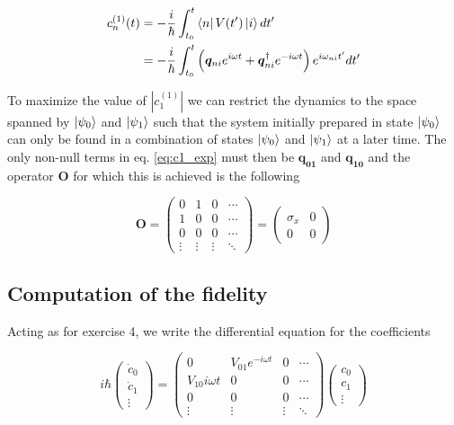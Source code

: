 \documentclass{article}
\begin{document}
\begin{align}
\label{eq:c1_exp}
c_n^{(1)}(t) & = -\frac{i}{\hbar} \int_{t_0}^t \bra{n} V(t') \ket{i} dt' \nonumber \\
& = -\frac{i}{\hbar} \int_{t_0}^t \left( \bm{q}_{ni} e^{i\omega t} + \bm{q}_{ni}^{\dagger} e^{-i\omega t}\right) e^{i\omega_{ni}t'} dt'
\end{align}

To maximize the value of \( |c_1^{(1)}| \) we can restrict the dynamics to the space spanned by \( \ket{\psi_0} \) and \( \ket{\psi_1} \) such that the system initially prepared in state \( \ket{\psi_0} \) can only be found in a combination of states \( \ket{\psi_0} \) and \( \ket{\psi_1} \) at a later time. The only non-null terms in eq. \eqref{eq:c1_exp} must then be \( \bm{q_{01}} \) and \( \bm{q_{10}} \) and the operator \( \bm{O} \) for which this is achieved is the following

\begin{equation}
\bm{O} =
  \begin{pmatrix}
    0 & 1 & 0 & \cdots \\
    1 & 0 & 0 & \cdots \\
    0 & 0 & 0 & \cdots \\
    \vdots & \vdots & \vdots & \ddots
  \end{pmatrix}
=
  \begin{pmatrix}
    \sigma_x & 0 \\
    0 & 0
  \end{pmatrix}
\end{equation}

\subsection{Computation of the fidelity}

Acting as for exercise 4, we write the differential equation for the coefficients

\begin{equation}
i \hbar
  \begin{pmatrix}
    \dot{c}_0 \\
    \dot{c}_1 \\
    \vdots
  \end{pmatrix}
=
  \begin{pmatrix}
    0 & V_{01}e^{-i\omega t} & 0 & \cdots \\
    V_{10}{i\omega t} & 0 & 0 & \cdots \\
    0 & 0 & 0 & \cdots \\
    \vdots & \vdots & \vdots & \ddots
  \end{pmatrix}
  \begin{pmatrix}
    c_0 \\
    c_1 \\
    \vdots
  \end{pmatrix}
\end{equation}
\end{document}

